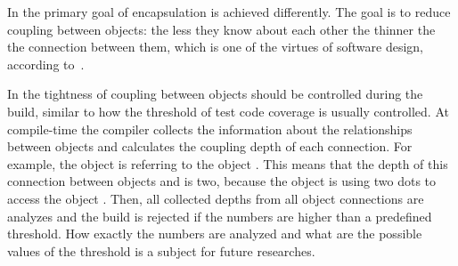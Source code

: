 In \eo{} the primary goal of encapsulation is achieved differently.
The goal is to reduce coupling between objects:
the less they know about each other the thinner the
the connection between them, which is one of the virtues of
software design, according to~\citet{yourdon1979structured}.

In \eo{} the tightness of coupling between objects should be controlled
during the build, similar to how the threshold of test code coverage is
usually controlled. At compile-time the compiler collects the information
about the relationships between objects and calculates the coupling depth of each connection.
For example, the object  is referring to the object
. This means that the depth of this connection between objects
 and  is two, because the object  is using
two dots to access the object . Then, all collected depths from
all object connections are analyzes and the build is rejected if the numbers
are higher than a predefined threshold. How exactly the numbers are analyzed
and what are the possible values of the threshold is a subject for future
researches.



